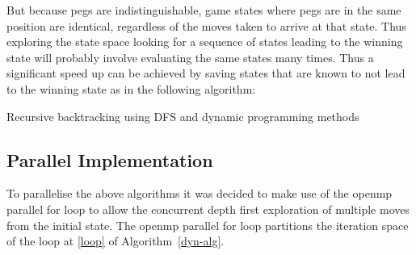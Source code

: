 \documentclass[12pt,a4paper]{report}
\begin{document}
But because pegs are indistinguishable, game states where pegs are in the same position are identical, regardless of the moves taken to arrive at that state. Thus exploring the state space looking for a sequence of states leading to the winning state will probably involve evaluating the same states many times. Thus a significant speed up can be achieved by saving states that are known to not lead to the winning state as in the following algorithm:

\begin{algorithm}[H]
	\DontPrintSemicolon
  \label{dyn-alg}
	\caption{Recursive backtracking using DFS and dynamic programming methods}
\end{algorithm}

\subsection*{Parallel Implementation}
To parallelise the above algorithms it was decided to make use of the openmp parallel for loop to allow the concurrent depth first exploration of multiple moves from the initial state. The openmp parallel for loop partitions the iteration space of the loop at \autoref{loop} of Algorithm~\autoref{dyn-alg}.
\end{document}
